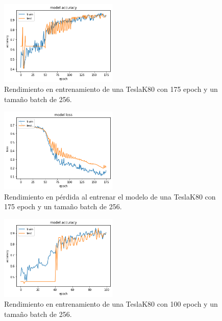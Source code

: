 \begin{figure}
    \centering
    \includegraphics[width=0.5\textwidth]{images/chapter5/batch_256_175_epoch.png}
    \caption{Rendimiento en entrenamiento de una TeslaK80 con 175 epoch y un tamaño batch de 256.}
    \label{fig:Resultados de la precisión de entrenamiento con un batch-size de 256 y 175 epochs}
\end{figure}

\begin{figure}
    \centering
    \includegraphics[width=0.5\textwidth]{images/chapter5/batch_256_175_epoch_loss.png}
    \caption{Rendimiento en pérdida al entrenar el modelo de una TeslaK80 con 175 epoch y un tamaño batch de 256.}
    \label{fig:Resultados de loss en el entrenamiento con un batch-size de 256 y 175 epochs}
\end{figure}

\begin{figure}
    \centering
    \includegraphics[width=0.5\textwidth]{images/chapter5/batch_256_100_epoch.png}
    \caption{Rendimiento en entrenamiento de una TeslaK80 con 100 epoch y un tamaño batch de 256.}
    \label{fig:Resultados de la precisión de entrenamiento con un batch-size de 256 y 100 epochs}
\end{figure}

